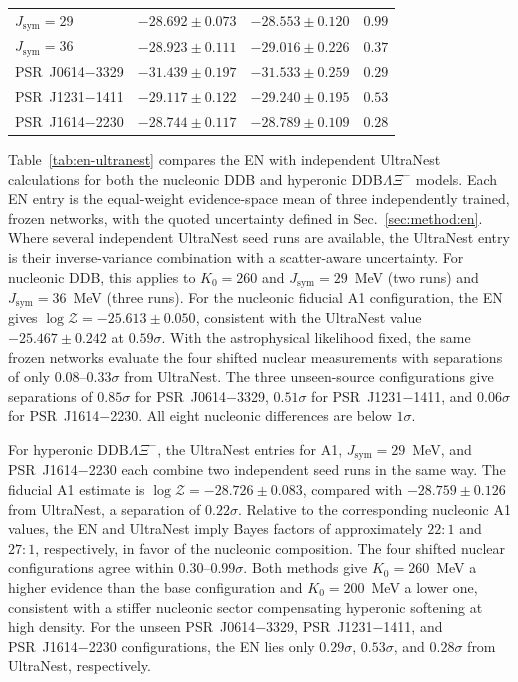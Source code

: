 \documentclass[aps,prd,twocolumn,superscriptaddress,nofootinbib,longbibliography]{revtex4-2}
\newenvironment{resulttablewide}{\begin{table}[tp]\centering}{\end{table}}
\begin{document}
\begin{resulttablewide}
\begin{minipage}{\textwidth}
\begin{tabular*}{\textwidth}{@{\extracolsep{\fill}}lccc@{}}
    $J_{\mathrm{sym}}=29$          & $-28.692 \pm 0.073$ & $-28.553 \pm 0.120$ & $0.99$ \\
    $J_{\mathrm{sym}}=36$          & $-28.923 \pm 0.111$ & $-29.016 \pm 0.226$ & $0.37$ \\
    PSR~J0614$-$3329                & $-31.439 \pm 0.197$ & $-31.533 \pm 0.259$ & $0.29$ \\
    PSR~J1231$-$1411                & $-29.117 \pm 0.122$ & $-29.240 \pm 0.195$ & $0.53$ \\
    PSR~J1614$-$2230                & $-28.744 \pm 0.117$ & $-28.789 \pm 0.109$ & $0.28$ \\
    \bottomrule
  \end{tabular*}
  \end{minipage}
\end{resulttablewide}

Table~\ref{tab:en-ultranest} compares the
EN with independent UltraNest calculations for both the nucleonic DDB and
hyperonic DDB$\Lambda\Xi^-$ models. Each EN entry is the equal-weight
evidence-space mean of three independently trained, frozen networks, with the
quoted uncertainty defined in Sec.~\ref{sec:method:en}. Where several
independent UltraNest seed runs are available, the UltraNest entry is their
inverse-variance combination with a scatter-aware uncertainty. For nucleonic
DDB, this applies to $K_0=260$ and $J_{\mathrm{sym}}=29$~MeV (two runs) and
$J_{\mathrm{sym}}=36$~MeV (three runs). For the nucleonic fiducial A1
configuration, the EN gives $\log\mathcal{Z}=-25.613\pm0.050$, consistent with
the UltraNest value $-25.467\pm0.242$ at $0.59\sigma$. With the astrophysical
likelihood fixed, the same frozen networks evaluate the four shifted nuclear
measurements with separations of only $0.08$--$0.33\sigma$ from UltraNest. The
three unseen-source configurations give separations of $0.85\sigma$ for
PSR~J0614$-$3329, $0.51\sigma$ for PSR~J1231$-$1411, and $0.06\sigma$ for
PSR~J1614$-$2230. All eight nucleonic differences are below $1\sigma$.

For hyperonic DDB$\Lambda\Xi^-$, the UltraNest entries
for A1, $J_{\mathrm{sym}}=29$~MeV, and PSR~J1614$-$2230 each combine two
independent seed runs in the same way. The fiducial A1 estimate is
$\log\mathcal{Z}=-28.726\pm0.083$, compared with $-28.759\pm0.126$ from
UltraNest, a separation of $0.22\sigma$. Relative to the corresponding
nucleonic A1 values, the EN and UltraNest imply Bayes factors of approximately
$22{:}1$ and $27{:}1$, respectively, in favor of the nucleonic composition. The
four shifted nuclear configurations agree within $0.30$--$0.99\sigma$. Both
methods give $K_0=260$~MeV a higher evidence than the base configuration and
$K_0=200$~MeV a lower one, consistent with a stiffer nucleonic sector
compensating hyperonic softening at high density. For the unseen
PSR~J0614$-$3329, PSR~J1231$-$1411, and PSR~J1614$-$2230 configurations, the EN
lies only $0.29\sigma$, $0.53\sigma$, and $0.28\sigma$ from UltraNest,
respectively.
\end{document}
